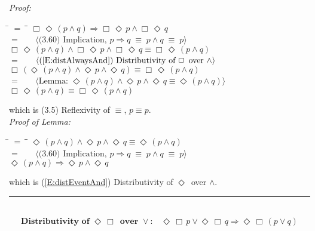 \documentclass[fleqn, leqno]{article}
\newcommand{\lgap}{2pt}                             %
\newcommand{\mymathindent}{24pt}                    %
\newcommand{\equivs}{\ensuremath{\;\equiv\;}}       %
\newcommand{\impl}{\ensuremath{\Rightarrow}}        %
\newcommand{\Event}{\Diamond\,}
\newcommand{\Always}{\Box\,}
\newcommand{\myqed}{\rule[-.23ex]{1.2ex}{2.0ex}}
\newcommand{\myqedtab}{\hspace{388.5pt}}              %
\newcommand{\Gll} {\langle}                         %
\newcommand{\Ggg} {\rangle}                         %
\newcommand{\Hint}[1]     {\ \ \ $\Gll              \mbox{#1} \Ggg$ }   %
\begin{document}
\emph{Proof:}
\begin{tabbing}
\hspace{\mymathindent} \= $= \;$ \= \myqedtab \= \kill
  \> \>   $\Always\Event(p \land q) \impl \Always\Event p \land \Always\Event q$\\[\lgap]
  \> $=$  \>  \Hint{(3.60) Implication, $p\impl q \equivs p\land q \equivs p$}\\[\lgap]
  \> \>   $\Always\Event(p \land q) \land \Always\Event p \land \Always\Event q \equiv \Always\Event(p \land q)$\\[\lgap]
  \> $=$  \>  \Hint{(\ref{E:distAlwaysAnd}) Distributivity of $\Always$ over $\land$}\\[\lgap]
  \> \>   $\Always(\Event(p \land q) \land \Event p \land \Event q) \equiv \Always\Event(p \land q)$\\[\lgap]
  \> $=$  \>  \Hint{Lemma: $\Event(p \land q) \land \Event p \land \Event q \equiv \Event(p \land q)$}\\[\lgap]
  \> \>   $\Always\Event(p \land q) \equiv \Always\Event(p \land q)$
\end{tabbing}
which is (3.5) Reflexivity of $\equiv$, $p\equiv p$.\\[\lgap]

\emph{Proof of Lemma:}
\begin{tabbing}
\hspace{\mymathindent} \= $= \;$ \= \myqedtab \= \kill
  \> \>   $\Event(p \land q) \land \Event p \land \Event q \equiv \Event(p \land q)$\\[\lgap]
  \> $=$  \>  \Hint{(3.60) Implication, $p\impl q \equivs p\land q \equivs p$}\\[\lgap]
  \> \>   $\Event(p \land q) \impl \Event p \land \Event q$
\end{tabbing}
which is (\ref{E:distEventAnd}) Distributivity of $\Event$ over $\land$. \hfill \myqed\\[\lgap]

\begin{equation}\label{E:distEventAlwaysOr}
\textbf{Distributivity of $\Event\Always$ over $\lor$:}\quad \Event\Always p \lor \Event\Always q \impl \Event\Always (p \lor q)
\end{equation}
\end{document}
